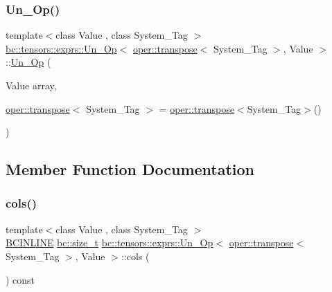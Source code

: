 \subsubsection{\texorpdfstring{Un\+\_\+\+Op()}{Un\_Op()}}
{\footnotesize\ttfamily template$<$class Value , class System\+\_\+\+Tag $>$ \\
\hyperlink{structbc_1_1tensors_1_1exprs_1_1Un__Op}{bc\+::tensors\+::exprs\+::\+Un\+\_\+\+Op}$<$ \hyperlink{structbc_1_1oper_1_1transpose}{oper\+::transpose}$<$ System\+\_\+\+Tag $>$, Value $>$\+::\hyperlink{structbc_1_1tensors_1_1exprs_1_1Un__Op}{Un\+\_\+\+Op} (\begin{DoxyParamCaption}\item[{Value}]{array,  }\item[{\hyperlink{structbc_1_1oper_1_1transpose}{oper\+::transpose}$<$ System\+\_\+\+Tag $>$}]{ = {\ttfamily \hyperlink{structbc_1_1oper_1_1transpose}{oper\+::transpose}$<$System\+\_\+Tag$>$()} }\end{DoxyParamCaption})\hspace{0.3cm}{\ttfamily [inline]}}



\subsection{Member Function Documentation}
\mbox{\label{structbc_1_1tensors_1_1exprs_1_1Un__Op_3_01oper_1_1transpose_3_01System__Tag_01_4_00_01Value_01_4_aafa9fe696925e2af41cde47d1b859b88}} 
\subsubsection{\texorpdfstring{cols()}{cols()}}
{\footnotesize\ttfamily template$<$class Value , class System\+\_\+\+Tag $>$ \\
\hyperlink{common_8h_a6699e8b0449da5c0fafb878e59c1d4b1}{B\+C\+I\+N\+L\+I\+NE} \hyperlink{namespacebc_aaf8e3fbf99b04b1b57c4f80c6f55d3c5}{bc\+::size\+\_\+t} \hyperlink{structbc_1_1tensors_1_1exprs_1_1Un__Op}{bc\+::tensors\+::exprs\+::\+Un\+\_\+\+Op}$<$ \hyperlink{structbc_1_1oper_1_1transpose}{oper\+::transpose}$<$ System\+\_\+\+Tag $>$, Value $>$\+::cols (\begin{DoxyParamCaption}{ }\end{DoxyParamCaption}) const\hspace{0.3cm}{\ttfamily [inline]}}

